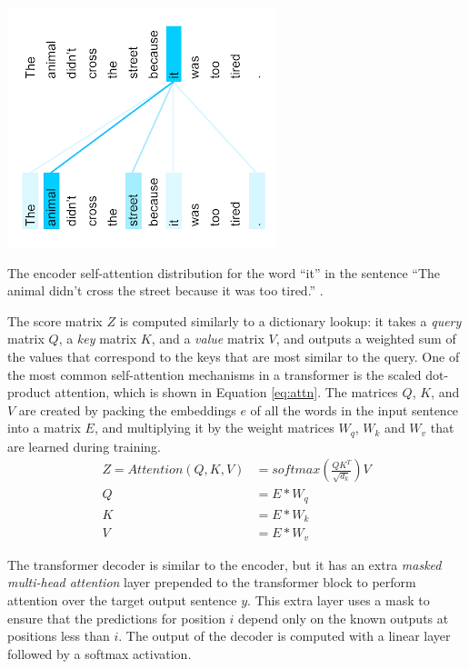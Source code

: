 \begin{table}[!h]
    \centering
    \includegraphics[width=0.6\columnwidth]{imgs/background/attn.png}
    \caption{The encoder self-attention distribution for the word ``it'' in the sentence
    ``The animal didn't cross the street because it was too tired.'' \cite{vaswani2017attention}.}
    \label{fig:attn}
\end{table}

The score matrix $Z$ is computed similarly to a dictionary lookup: it takes a \textit{query} matrix $Q$, a \textit{key} matrix $K$, and a \textit{value} matrix $V$, and outputs a weighted sum of the values that correspond to the keys that are most similar to the query. One of the most common self-attention mechanisms in a transformer is the scaled dot-product attention, which is shown in Equation \ref{eq:attn}. The matrices $Q$, $K$, and $V$ are created by packing the embeddings $e$ of all the words in the input sentence into a matrix $E$, and multiplying it by the weight matrices $W_q$, $W_k$ and $W_v$ that are learned during training.
\begin{equation}\label{eq:attn}
\begin{split}
    Z = Attention(Q, K, V) &= softmax(\frac{QK^T}{\sqrt{d_k}})V \\
    Q &= E * W_q \\
    K &= E * W_k \\
    V &= E * W_v
\end{split}
\end{equation}

The transformer decoder is similar to the encoder, but it has an extra \textit{masked multi-head attention} layer prepended to the transformer block to perform attention over the target output sentence $y$. This extra layer uses a mask to ensure that the predictions for position $i$ depend only on the known outputs at positions less than $i$. The output of the decoder is computed with a linear layer followed by a softmax activation.


